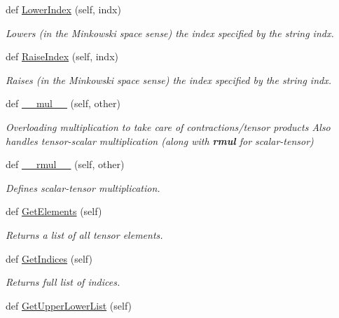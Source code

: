 \begin{DoxyCompactItemize}
def \hyperlink{class_py_spinor_1_1_tensor_1_1_tensor_afda6832e82410d0e34e9fbe87d421975}{Lower\+Index} (self, indx)
\begin{DoxyCompactList}\small\item\em Lowers (in the Minkowski space sense) the index specified by the string indx. \end{DoxyCompactList}\item 
def \hyperlink{class_py_spinor_1_1_tensor_1_1_tensor_a08ca3ade5041ba809ecc8021e65fc540}{Raise\+Index} (self, indx)
\begin{DoxyCompactList}\small\item\em Raises (in the Minkowski space sense) the index specified by the string indx. \end{DoxyCompactList}\item 
def \hyperlink{class_py_spinor_1_1_tensor_1_1_tensor_a9a632076f7b5fc8503278c61b797e97e}{\+\_\+\+\_\+mul\+\_\+\+\_\+} (self, other)
\begin{DoxyCompactList}\small\item\em Overloading multiplication to take care of contractions/tensor products Also handles tensor-\/scalar multiplication (along with {\bfseries rmul} for scalar-\/tensor) \end{DoxyCompactList}\item 
def \hyperlink{class_py_spinor_1_1_tensor_1_1_tensor_a4faf9399322872bc10fbd763bf3fecf8}{\+\_\+\+\_\+rmul\+\_\+\+\_\+} (self, other)
\begin{DoxyCompactList}\small\item\em Defines scalar-\/tensor multiplication. \end{DoxyCompactList}\item 
def \hyperlink{class_py_spinor_1_1_tensor_1_1_tensor_a38778134828ac330a8fd47db7adecd41}{Get\+Elements} (self)
\begin{DoxyCompactList}\small\item\em Returns a list of all tensor elements. \end{DoxyCompactList}\item 
def \hyperlink{class_py_spinor_1_1_tensor_1_1_tensor_aea7739cc1baad06bca6a8ab7ba3cc95c}{Get\+Indices} (self)
\begin{DoxyCompactList}\small\item\em Returns full list of indices. \end{DoxyCompactList}\item 
def \hyperlink{class_py_spinor_1_1_tensor_1_1_tensor_a5db7ef36bb183c503a300ae40c22a55c}{Get\+Upper\+Lower\+List} (self)

\end{DoxyCompactItemize}
